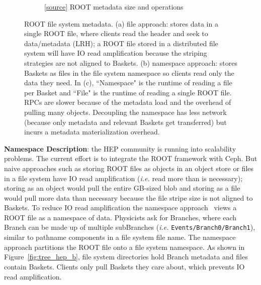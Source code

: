 \begin{figure}[tb]
\begin{subfigure}[b]{.4\linewidth}
      \caption{
      [\href{https://github.com/michaelsevilla/tintenfisch-popper/blob/master/pipelines/hep/visualize/viz.ipynb}{source}]
      ROOT metadata size and operations}
      \label{fig:hep_runtime}
    \end{subfigure}
\caption{ROOT file system metadata. (a) file approach: stores data in a single
ROOT file, where clients read the header and seek to data/metadata (LRH); a
ROOT file stored in a distributed file system will have IO read amplification
because the striping strategies are not aligned to Baskets. (b) namespace
approach: stores Baskets as files in the file system namespace so clients read
only the data they need. In (c), ``Namespace" is the runtime of reading a file
per Basket and ``File" is the runtime of reading a single ROOT file. RPCs are
slower because of the metadata load and the overhead of pulling many objects.
Decoupling the namespace has less network (because only metadata and relevant
Baskets get transferred) but incurs a metadata materialization overhead.}
\end{figure}

\textbf{Namespace Description}: the HEP community is running into scalability
problems.  The current effort is to integrate the ROOT framework with Ceph. But
naive approaches such as storing ROOT files as objects in an object store or
files in a file system have IO read amplification ({\it i.e.} read more than is
necessary); storing as an object would pull the entire GB-sized blob and
storing as a file would pull more data than necessary because the file stripe
size is not aligned to Baskets.  To reduce IO read amplification the namespace
approach~\cite{pivarski:indico17-root} views a ROOT file as a namespace of
data.  Physicists ask for Branches, where each Branch can be made up of
multiple subBranches ({\it i.e.} \texttt{Events/Branch0/Branch1}), similar to
pathname components in a file system file name. The namespace approach
partitions the ROOT file onto a file system namespace.  As shown in
Figure~\ref{fig:tree_hep_b}, file system directories hold Branch metadata and
files contain Baskets. Clients only pull Baskets they care about, which
prevents IO read amplification.  

